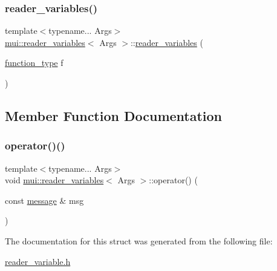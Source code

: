 \mbox{\label{structmui_1_1reader__variables_a60e48ba3313369ed2a3180a7826129f1}} 
\subsubsection{\texorpdfstring{reader\+\_\+variables()}{reader\_variables()}\hspace{0.1cm}{\footnotesize\ttfamily [2/2]}}
{\footnotesize\ttfamily template$<$typename... Args$>$ \\
\hyperlink{structmui_1_1reader__variables}{mui\+::reader\+\_\+variables}$<$ Args $>$\+::\hyperlink{structmui_1_1reader__variables}{reader\+\_\+variables} (\begin{DoxyParamCaption}\item[{\hyperlink{structmui_1_1reader__variables_a55fa3e6c55f9ce1a4f4031de4c9843e4}{function\+\_\+type}}]{f }\end{DoxyParamCaption})\hspace{0.3cm}{\ttfamily [inline]}}



\subsection{Member Function Documentation}
\mbox{\label{structmui_1_1reader__variables_a622185f191581ff0c15b1ba5ff43ea59}} 
\subsubsection{\texorpdfstring{operator()()}{operator()()}}
{\footnotesize\ttfamily template$<$typename... Args$>$ \\
void \hyperlink{structmui_1_1reader__variables}{mui\+::reader\+\_\+variables}$<$ Args $>$\+::operator() (\begin{DoxyParamCaption}\item[{const \hyperlink{structmui_1_1message}{message} \&}]{msg }\end{DoxyParamCaption})\hspace{0.3cm}{\ttfamily [inline]}}



The documentation for this struct was generated from the following file\+:\begin{DoxyCompactItemize}
\item 
\hyperlink{reader__variable_8h}{reader\+\_\+variable.\+h}\end{DoxyCompactItemize}
